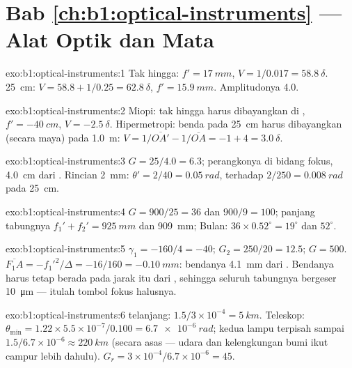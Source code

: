 \section*{Bab \ref{ch:b1:optical-instruments} --- Alat Optik dan Mata}

\begin{solution}{exo:b1:optical-instruments:1}
Tak hingga: $f' = \qty{17}{mm}$, $V = 1/0.017 = \qty{58.8}{\delta}$.
\qty{25}{cm}: $V = 58.8 + 1/0.25 = \qty{62.8}{\delta}$, $f' = \qty{15.9}{mm}$.
Amplitudonya \qty{4.0}{\delta}.
\end{solution}

\begin{solution}{exo:b1:optical-instruments:2}
Miopi: tak hingga harus dibayangkan di , $f' = \qty{-40}{cm}$,
$V = \qty{-2.5}{\delta}$. Hipermetropi: benda pada \qty{25}{cm} harus
dibayangkan (secara maya) pada \qty{1.0}{m}: $V = 1/\overline{OA'} - 1/\overline{OA}
= -1 + 4 = \qty{+3.0}{\delta}$.
\end{solution}

\begin{solution}{exo:b1:optical-instruments:3}
$G = 25/4.0 = 6.3$; perangkonya di bidang fokus, \qty{4.0}{cm} dari
. Rincian \qty{2}{mm}: $\theta' = 2/40 = \qty{0.05}{rad}$, terhadap
$2/250 = \qty{0.008}{rad}$ pada \qty{25}{cm}.
\end{solution}

\begin{solution}{exo:b1:optical-instruments:4}
$G = 900/25 = 36$ dan $900/9 = 100$; panjang tabungnya $f_1' + f_2' =
\qty{925}{mm}$ dan \qty{909}{mm}; Bulan: $36 \times 0.52^\circ = 19^\circ$
dan $52^\circ$.
\end{solution}

\begin{solution}{exo:b1:optical-instruments:5}
$\gamma_1 = -160/4 = -40$; $G_2 = 250/20 = 12.5$; $G = 500$.
$\overline{F_1A} = -f_1'^2/\Delta = -16/160 = \qty{-0.10}{mm}$: bendanya
\qty{4.1}{mm} dari . Bendanya harus tetap berada pada jarak
itu dari , sehingga seluruh tabungnya bergeser
\qty{10}{\micro m} --- itulah tombol fokus halusnya.
\end{solution}

\begin{solution}{exo:b1:optical-instruments:6}
 telanjang: $1.5/3\times10^{-4} = \qty{5}{km}$. Teleskop: $\theta_{\min}
= 1.22 \times 5.5\times10^{-7}/0.100 = \qty{6.7e-6}{rad}$; kedua lampu
terpisah sampai $1.5/6.7\times10^{-6} \approx \qty{220}{km}$ (secara
asas --- udara dan kelengkungan bumi ikut campur lebih dahulu).
$G_r = 3\times10^{-4}/
6.7\times10^{-6} = 45$.
\end{solution}

